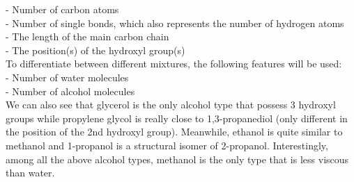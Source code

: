 - Number of carbon atoms\\
- Number of single bonds, which also represents the number of hydrogen atoms\\
- The length of the main carbon chain\\
- The position(s) of the hydroxyl group(s)\\
To differentiate between different mixtures, the following features will be used:\\
- Number of water molecules\\
- Number of alcohol molecules\\
We can also see that glycerol is the only alcohol type that possess 3 hydroxyl 
groups while propylene glycol is really close to 1,3-propanediol 
(only different in the position of the 2nd hydroxyl group). Meanwhile, 
ethanol is quite similar to methanol and 1-propanol is a structural isomer 
of 2-propanol. Interestingly, among all the above alcohol types, methanol 
is the only type that is less viscous than water.
